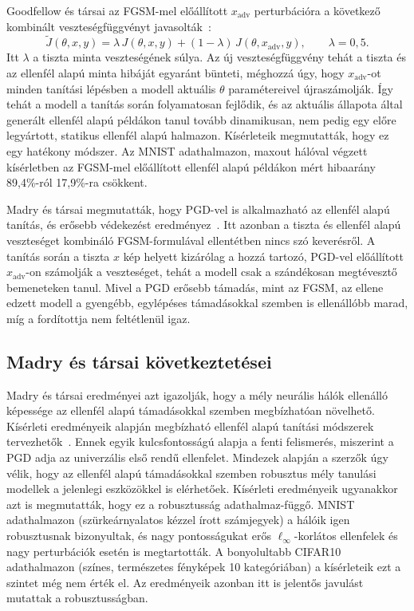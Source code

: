 Goodfellow és társai az FGSM-mel előállított $x_{\mathrm{adv}}$ perturbációra a következő kombinált veszteségfüggvényt 
javasolták~\cite{goodfellow2015explaining}: 
\[
\tilde{J}(\theta, x, y) = \lambda \, J(\theta, x, y) + (1-\lambda)\, J(\theta, x_{\mathrm{adv}}, y), \qquad \lambda = 0{,}5.
\]
Itt $\lambda$ a tiszta minta veszteségének súlya. 
Az új veszteségfüggvény tehát a tiszta és az ellenfél alapú minta hibáját egyaránt bünteti, méghozzá úgy, hogy 
$x_{\mathrm{adv}}$-ot minden tanítási lépésben a modell aktuális $\theta$ paramétereivel újraszámolják. 
Így tehát a modell a tanítás során folyamatosan fejlődik, és az aktuális állapota által generált ellenfél alapú példákon 
tanul tovább dinamikusan, nem pedig egy előre legyártott, statikus ellenfél alapú halmazon. 
Kísérleteik megmutatták, hogy ez egy hatékony módszer. 
Az MNIST adathalmazon, maxout hálóval végzett kísérletben az FGSM-mel előállított ellenfél alapú példákon mért hibaarány 
89,4\%-ról 17,9\%-ra csökkent. 

Madry és társai megmutatták, hogy PGD-vel is alkalmazható az ellenfél alapú tanítás, és erősebb védekezést 
eredményez~\cite{madry2018towards}. 
Itt azonban a tiszta és ellenfél alapú veszteséget kombináló FGSM-formulával ellentétben nincs szó keverésről. 
A tanítás során a tiszta $x$ kép helyett kizárólag a hozzá tartozó, PGD-vel előállított $x_{\mathrm{adv}}$-on számolják a 
veszteséget, tehát a modell csak a szándékosan megtévesztő bemeneteken tanul. 
Mivel a PGD erősebb támadás, mint az FGSM, az ellene edzett modell a gyengébb, egylépéses támadásokkal szemben is ellenállóbb 
marad, míg a fordítottja nem feltétlenül igaz. 

\subsection{Madry és társai következtetései}
Madry és társai eredményei azt igazolják, hogy a mély neurális hálók ellenálló képessége az ellenfél alapú támadásokkal szemben 
megbízhatóan növelhető. 
Kísérleti eredményeik alapján megbízható ellenfél alapú tanítási módszerek tervezhetők~\cite{madry2018towards}. 
Ennek egyik kulcsfontosságú alapja a fenti felismerés, miszerint a PGD adja az univerzális első rendű ellenfelet. 
Mindezek alapján a szerzők úgy vélik, hogy az ellenfél alapú támadásokkal szemben robusztus mély tanulási modellek a jelenlegi 
eszközökkel is elérhetőek. 
Kísérleti eredményeik ugyanakkor azt is megmutatták, hogy ez a robusztusság adathalmaz-függő. 
MNIST adathalmazon (szürkeárnyalatos kézzel írott számjegyek) a hálóik igen robusztusnak bizonyultak, és nagy pontosságukat erős 
$\ell_\infty$-korlátos ellenfelek és nagy perturbációk esetén is megtartották. 
A bonyolultabb CIFAR10 adathalmazon (színes, természetes fényképek 10 kategóriában) a kísérleteik ezt a szintet még nem érték el. 
Az eredményeik azonban itt is jelentős javulást mutattak a robusztusságban. 


